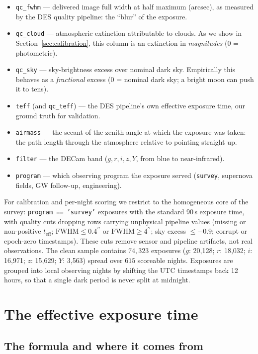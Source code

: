 \documentclass[11pt]{article}
\newcommand{\teff}{t_{\mathrm{eff}}}
\newcommand{\fwhm}{\mathrm{FWHM}}
\newcommand{\arcsecunit}{^{\prime\prime}}
\begin{document}
\begin{itemize}
  \item \texttt{qc\_fwhm} --- delivered image full width at half maximum (arcsec), as
    measured by the DES quality pipeline: the ``blur'' of the exposure.
  \item \texttt{qc\_cloud} --- atmospheric extinction attributable to clouds. As we
    show in Section~\ref{sec:calibration}, this column is an extinction in
    \emph{magnitudes} (0 = photometric).
  \item \texttt{qc\_sky} --- sky-brightness excess over nominal dark sky. Empirically
    this behaves as a \emph{fractional} excess (0 = nominal dark sky; a bright moon
    can push it to tens).
  \item \texttt{teff} (and \texttt{qc\_teff}) --- the DES pipeline's own effective
    exposure time, our ground truth for validation.
  \item \texttt{airmass} --- the secant of the zenith angle at which the exposure was
    taken: the path length through the atmosphere relative to pointing straight up.
  \item \texttt{filter} --- the DECam band ($g,r,i,z,Y$, from blue to near-infrared).
  \item \texttt{program} --- which observing program the exposure served
    (\texttt{survey}, supernova fields, GW follow-up, engineering).
\end{itemize}

For calibration and per-night scoring we restrict to the homogeneous core of the
survey: \texttt{program == 'survey'} exposures with the standard 90\,s exposure time,
with quality cuts dropping rows carrying unphysical pipeline values (missing or
non-positive $\teff$; $\fwhm \le 0.4\arcsecunit$ or $\fwhm \ge 4\arcsecunit$; sky
excess $\le -0.9$; corrupt or epoch-zero timestamps). These cuts remove
sensor and pipeline artifacts, not real observations. The clean sample contains
$74{,}323$ exposures ($g$: 20{,}128; $r$: 18{,}032; $i$: 16{,}971; $z$: 15{,}629; $Y$:
3{,}563) spread over $615$ scoreable nights. Exposures are grouped into local
observing nights by shifting the UTC timestamps back 12 hours, so that a single dark
period is never split at midnight.

\section{The effective exposure time}
\label{sec:teff}

\subsection{The formula and where it comes from}
\end{document}
